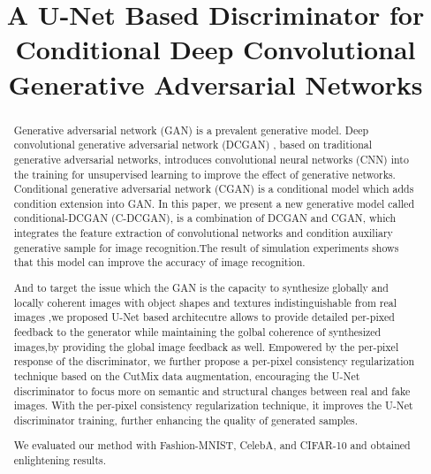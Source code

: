 \documentclass[conference, a4paper]{IEEEtran}
\begin{document}
\title{A U-Net Based Discriminator for Conditional Deep Convolutional Generative Adversarial Networks
}

\author{
	\and
}
\maketitle

\begin{abstract}
	Generative adversarial network (GAN) \cite{a} is a prevalent generative model. Deep convolutional generative adversarial network (DCGAN) \cite{c}, based on traditional generative adversarial networks, introduces convolutional neural networks (CNN) into the training for unsupervised learning to improve the effect of generative networks. Conditional generative adversarial network (CGAN) \cite{b} is a conditional model which adds condition extension into GAN. In this paper, we present a new generative model called conditional-DCGAN (C-DCGAN), is a combination of DCGAN and CGAN, which integrates the feature extraction of convolutional networks and condition auxiliary generative sample for image recognition.The result of simulation experiments shows that this model can improve the accuracy of image recognition.
	 
	And to target the issue which the GAN is the capacity to synthesize globally and locally coherent images with object shapes and textures indistinguishable from real images \cite{e},we proposed U-Net \cite{d} based architecutre allows to provide detailed per-pixed feedback to the generator while maintaining the golbal coherence of synthesized images,by providing the global image feedback as well.
	Empowered by the per-pixel response of the discriminator, we further propose a per-pixel consistency regularization technique based on the CutMix data augmentation, encouraging the U-Net discriminator to focus more on semantic and structural changes between real and fake images. With the per-pixel consistency regularization technique, it improves the U-Net discriminator training, further enhancing the quality of generated samples.
	
	We evaluated our method with Fashion-MNIST, CelebA, and
	CIFAR-10 and obtained enlightening results.
\end{abstract}
\end{document}
